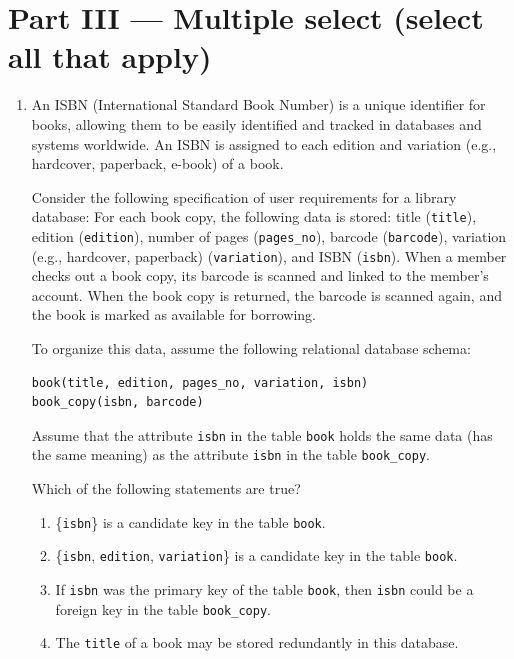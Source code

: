 \documentclass{article}
\begin{document}
\section*{Part III — Multiple select (select all that apply)}
\begin{enumerate}
  \item An ISBN (International Standard Book Number) is a unique identifier for books, allowing them to be easily identified and tracked in databases and systems worldwide. An ISBN is assigned to each edition and variation (e.g., hardcover, paperback, e-book) of a book.

\medskip

\noindent
Consider the following specification of user requirements for a library database: For each book copy, the following data is stored: title (\texttt{title}), edition (\texttt{edition}), number of pages (\texttt{pages\_no}), barcode (\texttt{barcode}), variation (e.g., hardcover, paperback) (\texttt{variation}), and ISBN (\texttt{isbn}). When a member checks out a book copy, its barcode is scanned and linked to the member's account. When the book copy is returned, the barcode is scanned again, and the book is marked as available for borrowing.

\medskip

\noindent
To organize this data, assume the following relational database schema:
\begin{verbatim}
book(title, edition, pages_no, variation, isbn)
book_copy(isbn, barcode)
\end{verbatim}

\noindent
Assume that the attribute \texttt{isbn} in the table \texttt{book} holds the same data (has the same meaning) as the attribute \texttt{isbn} in the table \texttt{book\_copy}.

\medskip

\noindent
Which of the following statements are true?
\begin{enumerate}
  \item[(A)] \{\texttt{isbn}\} is a candidate key in the table \texttt{book}.
  \item[(B)] \{\texttt{isbn}, \texttt{edition}, \texttt{variation}\} is a candidate key in the table \texttt{book}.
  \item[(C)] If \texttt{isbn} was the primary key of the table \texttt{book}, then \texttt{isbn} could be a foreign key in the table \texttt{book\_copy}.
  \item[(D)] The \texttt{title} of a book may be stored redundantly in this database.
\end{enumerate}


\end{enumerate}
\end{document}
